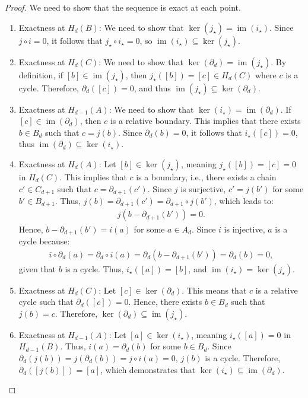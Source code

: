\begin{proof}
We need to show that the sequence is exact at each point. 
\begin{enumerate}
	\item Exactness at \(H_{d}(B)\): We need to show that \(\ker(j_\star) = \operatorname{im}(i_\star)\). Since \(j \circ i = 0\), it follows that \(j_\star \circ i_\star = 0\), so \(\operatorname{im}(i_\star) \subseteq \ker(j_\star)\).
	\item Exactness at \(H_{d}(C)\): We need to show that \(\ker(\partial_d) = \operatorname{im}(j_\star)\). By definition, if \([b] \in \operatorname{im}(j_\star)\), then \(j_\star([b]) = [c] \in H_{d}(C)\) where \(c\) is a cycle. Therefore, \(\partial_d([c]) = 0\), and thus \(\operatorname{im}(j_\star) \subseteq \ker(\partial_d)\).
	\item Exactness at \(H_{d-1}(A)\): We need to show that \(\ker(i_\star) = \operatorname{im}(\partial_d)\). If \([c] \in \operatorname{im}(\partial_d)\), then \(c\) is a relative boundary. This implies that there exists \(b \in B_{d}\) such that \(c = j(b)\). Since \(\partial_d(b) = 0\), it follows that \(i_\star([c]) = 0\), thus \(\operatorname{im}(\partial_d) \subseteq \ker(i_\star)\).
	\item Exactness at \(H_{d}(A)\): Let \([b] \in \ker(j_\star)\), meaning \(j_\star([b]) = [c] = 0\) in \(H_{d}(C)\). This implies that \(c\) is a boundary, i.e., there exists a chain \(c' \in C_{d+1}\) such that \(c = \partial_{d+1}(c')\). Since \(j\) is surjective, \(c' = j(b')\) for some \(b' \in B_{d+1}\). Thus, \(j(b) = \partial_{d+1}(c') = \partial_{d+1}\circ j(b')\), which leads to:
\begin{align}
j(b - \partial_{d+1}(b')) = 0.
\end{align}
Hence, \(b - \partial_{d+1}(b') = i(a)\) for some \(a \in A_{d}\). Since \(i\) is injective, \(a\) is a cycle because:
\begin{align}
i \circ \partial_{d}(a) = \partial_{d} \circ i(a) = \partial_{d}(b - \partial_{d+1}(b')) = \partial_{d}(b) = 0,
\end{align}
given that \(b\) is a cycle. Thus, \(i_\star([a]) = [b]\), and \(\operatorname{im}(i_\star) = \ker(j_\star)\).
	\item Exactness at \(H_{d}(C)\): Let \([c] \in \ker(\partial_d)\). This means that \(c\) is a relative cycle such that \(\partial_d([c]) = 0\). Hence, there exists \(b \in B_{d}\) such that \(j(b) = c\). Therefore, \(\ker(\partial_d) \subseteq \operatorname{im}(j_\star)\).
	\item Exactness at \(H_{d-1}(A)\): Let \([a] \in \ker(i_\star)\), meaning \(i_\star([a]) = 0\) in \(H_{d-1}(B)\). Thus, \(i(a) = \partial_d(b)\) for some \(b \in B_d\). Since \(\partial_d(j(b)) = j(\partial_d(b)) = j \circ i(a) = 0\), \(j(b)\) is a cycle. Therefore, \(\partial_d([j(b)]) = [a]\), which demonstrates that \(\ker(i_\star) \subseteq \operatorname{im}(\partial_d)\).
\end{enumerate}
\end{proof}

